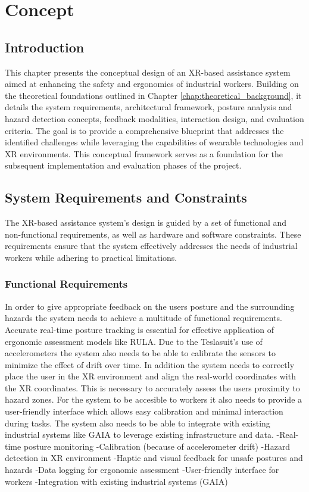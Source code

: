 \chapter{Concept}
\label{chap:concept}

\section{Introduction}
This chapter presents the conceptual design of an XR-based assistance system aimed at enhancing the safety and ergonomics of industrial workers. Building on the theoretical foundations outlined in Chapter \ref{chap:theoretical_background}, it details the system requirements, architectural framework, posture analysis and hazard detection concepts, feedback modalities, interaction design, and evaluation criteria. The goal is to provide a comprehensive blueprint that addresses the identified challenges while leveraging the capabilities of wearable technologies and XR environments. This conceptual framework serves as a foundation for the subsequent implementation and evaluation phases of the project.

\section{System Requirements and Constraints}
The XR-based assistance system's design is guided by a set of functional and non-functional requirements, as well as hardware and software constraints. These requirements ensure that the system effectively addresses the needs of industrial workers while adhering to practical limitations.

\subsection{Functional Requirements}
In order to give appropriate feedback on the users posture and the surrounding hazards the system needs to achieve a multitude of functional requirements. 
Accurate real-time posture tracking is essential for effective application of ergonomic assessment models like RULA. Due to the Teslasuit's use of accelerometers the system also needs to be able to calibrate the sensors to minimize the effect of drift over time. In addition the system needs to correctly place the user in the XR environment and align the real-world coordinates with the XR coordinates. This is necessary to accurately assess the users proximity to hazard zones. For the system to be accesible to workers it also needs to provide a user-friendly interface which allows easy calibration and minimal interaction during tasks. The system also needs to be able to integrate with existing industrial systems like GAIA to leverage existing infrastructure and data. 
-Real-time posture monitoring
-Calibration (because of accelerometer drift)
-Hazard detection in XR environment
-Haptic and visual feedback for unsafe postures and hazards
-Data logging for ergonomic assessment
-User-friendly interface for workers
-Integration with existing industrial systems (GAIA)

